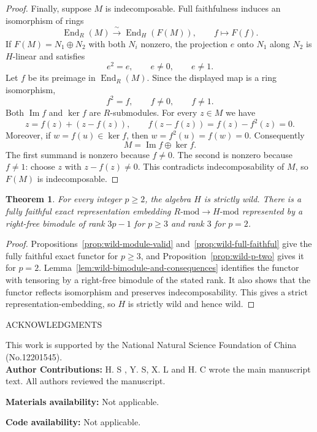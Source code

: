 \documentclass[10pt,oneside]{amsart}
\newtheorem{theorem}[proposition]{Theorem}
\theoremstyle{definition}
\def\>{\geqslant}
\begin{document}
\begin{proof}
Finally, suppose $M$ is indecomposable. Full faithfulness induces
an isomorphism of rings
\[
 \operatorname{End}_R(M)\xrightarrow{\ \sim\ }
       \operatorname{End}_H(F(M)),\qquad f\longmapsto F(f).
\]
If $F(M)=N_1\oplus N_2$ with both $N_i$ nonzero, the projection
$e$ onto $N_1$ along $N_2$ is $H$-linear and satisfies
\[
 e^2=e,\qquad e\ne0,\qquad e\ne1.
\]
Let $f$ be its preimage in $\operatorname{End}_R(M)$. Since the
displayed map is a ring isomorphism,
\[
 f^2=f,\qquad f\ne0,\qquad f\ne1.
\]
Both $\operatorname{Im}f$ and $\ker f$ are $R$-submodules. For every
$z\in M$ we have
\[
 z=f(z)+(z-f(z)),\qquad f(z-f(z))=f(z)-f^2(z)=0.
\]
Moreover, if $w=f(u)\in\ker f$, then
$w=f^2(u)=f(w)=0$. Consequently
\[
 M=\operatorname{Im}f\oplus\ker f.
\]
The first summand is nonzero because $f\ne0$. The second is nonzero
because $f\ne1$: choose $z$ with $z-f(z)\ne0$.
This contradicts indecomposability of $M$, so $F(M)$ is
indecomposable.
\end{proof}

\begin{theorem}\label{thm:strict-wildness}
For every integer $p\ge2$, the algebra $H$ is strictly wild.
There is a fully faithful exact representation embedding
$R\text{-mod}\to H\text{-mod}$ represented by a right-free bimodule
of rank $3p-1$ for $p\ge3$ and rank $3$ for $p=2$.
\end{theorem}
\begin{proof}
Propositions~\ref{prop:wild-module-valid}
and~\ref{prop:wild-full-faithful} give the fully faithful exact functor for $p\>3$, and
Proposition~\ref{prop:wild-p-two} gives it for $p=2$. Lemma~\ref{lem:wild-bimodule-and-consequences} identifies the functor with tensoring by a right-free bimodule of the stated rank. It also shows that the functor reflects isomorphism and preserves indecomposability. This gives a strict representation-embedding, so $H$ is strictly  wild and hence wild.
\end{proof}


\centerline{ACKNOWLEDGMENTS}

This work is supported by the National Natural Science Foundation of China  (No.12201545).\\

{\bf Author Contributions:} H. S ,  Y. S, X. L  and H. C wrote the  main manuscript text. All authors reviewed the manuscript.

{\bf Materials availability:} Not applicable.

{\bf Code availability:} Not applicable.
\end{document}
